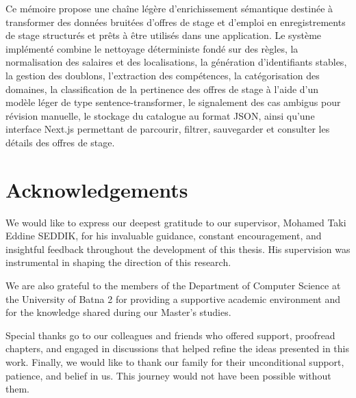 Ce mémoire propose une chaîne légère d'enrichissement sémantique destinée à transformer des données bruitées d'offres de stage et d'emploi en enregistrements de stage structurés et prêts à être utilisés dans une application. Le système implémenté combine le nettoyage déterministe fondé sur des règles, la normalisation des salaires et des localisations, la génération d'identifiants stables, la gestion des doublons, l'extraction des compétences, la catégorisation des domaines, la classification de la pertinence des offres de stage à l'aide d'un modèle léger de type sentence-transformer, le signalement des cas ambigus pour révision manuelle, le stockage du catalogue au format JSON, ainsi qu'une interface Next.js permettant de parcourir, filtrer, sauvegarder et consulter les détails des offres de stage.

\chapter*{Acknowledgements}
We would like to express our deepest gratitude to our supervisor, Mohamed Taki Eddine SEDDIK, for his invaluable guidance, constant encouragement, and insightful feedback throughout the development of this thesis. His supervision was instrumental in shaping the direction of this research.

We are also grateful to the members of the Department of Computer Science at the University of Batna 2 for providing a supportive academic environment and for the knowledge shared during our Master's studies.

Special thanks go to our colleagues and friends who offered support, proofread chapters, and engaged in discussions that helped refine the ideas presented in this work. Finally, we would like to thank our family for their unconditional support, patience, and belief in us. This journey would not have been possible without them.

\tableofcontents
\listoffigures
\listoftables

\printglossaries
\clearpage
{}
